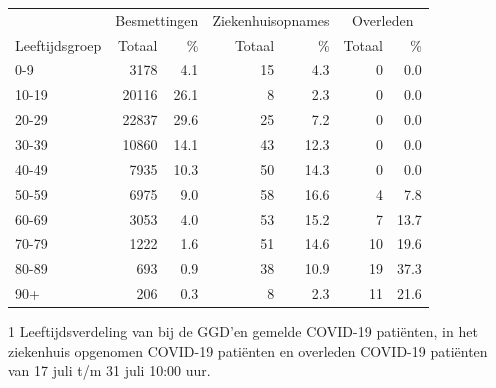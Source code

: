 \documentclass[
  english,
  man,floatsintext]{apa6}
\begin{document}
\begin{table}
\centering\begingroup\fontsize{11}{13}\selectfont

\begin{threeparttable}
\begin{tabular}{lrrrrrr}
\toprule
\multicolumn{1}{c}{ } & \multicolumn{2}{c}{Besmettingen} & \multicolumn{2}{c}{Ziekenhuisopnames} & \multicolumn{2}{c}{Overleden} \\
\cmidrule(l{3pt}r{3pt}){2-3} \cmidrule(l{3pt}r{3pt}){4-5} \cmidrule(l{3pt}r{3pt}){6-7}
Leeftijdsgroep & Totaal & \% & Totaal & \% & Totaal & \%\\
\midrule
0-9 & 3178 & 4.1 & 15 & 4.3 & 0 & 0.0\\
10-19 & 20116 & 26.1 & 8 & 2.3 & 0 & 0.0\\
20-29 & 22837 & 29.6 & 25 & 7.2 & 0 & 0.0\\
30-39 & 10860 & 14.1 & 43 & 12.3 & 0 & 0.0\\
40-49 & 7935 & 10.3 & 50 & 14.3 & 0 & 0.0\\
50-59 & 6975 & 9.0 & 58 & 16.6 & 4 & 7.8\\
60-69 & 3053 & 4.0 & 53 & 15.2 & 7 & 13.7\\
70-79 & 1222 & 1.6 & 51 & 14.6 & 10 & 19.6\\
80-89 & 693 & 0.9 & 38 & 10.9 & 19 & 37.3\\
90+ & 206 & 0.3 & 8 & 2.3 & 11 & 21.6\\
\bottomrule
\end{tabular}
\begin{tablenotes}
\item[1] Leeftijdsverdeling van bij de GGD’en gemelde COVID-19 patiënten, in het ziekenhuis opgenomen COVID-19 patiënten en overleden COVID-19 patiënten van 17 juli t/m 31 juli 10:00 uur.
\end{tablenotes}
\end{threeparttable}
\endgroup{}
\end{table}

\newpage
\end{document}
